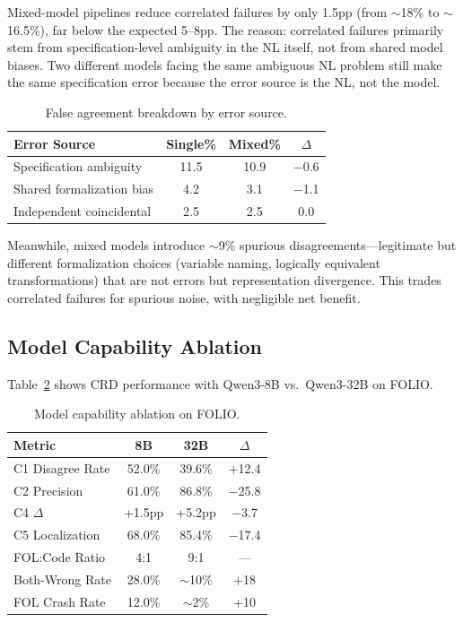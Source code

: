 \documentclass[11pt,a4paper]{article}
\newcommand{\pp}{\text{pp}}
\begin{document}
Mixed-model pipelines reduce correlated failures by only 1.5pp (from $\sim$18\% to $\sim$16.5\%), far below the expected 5--8pp. The reason: correlated failures primarily stem from specification-level ambiguity in the NL itself, not from shared model biases. Two different models facing the same ambiguous NL problem still make the same specification error because the error source is the NL, not the model.

\begin{table}[t]
\centering
\small
\caption{False agreement breakdown by error source.}
\label{tab:false_agree}
\begin{tabular}{lccc}
\toprule
\textbf{Error Source} & \textbf{Single\%} & \textbf{Mixed\%} & $\Delta$ \\
\midrule
Specification ambiguity & 11.5 & 10.9 & $-$0.6 \\
Shared formalization bias & 4.2 & 3.1 & $-$1.1 \\
Independent coincidental & 2.5 & 2.5 & 0.0 \\
\bottomrule
\end{tabular}
\end{table}

Meanwhile, mixed models introduce $\sim$9\% spurious disagreements---legitimate but different formalization choices (variable naming, logically equivalent transformations) that are not errors but representation divergence. This trades correlated failures for spurious noise, with negligible net benefit.

\subsection{Model Capability Ablation}
\label{sec:capability}

Table~\ref{tab:model_cap} shows CRD performance with Qwen3-8B vs.\ Qwen3-32B on FOLIO.

\begin{table}[t]
\centering
\small
\caption{Model capability ablation on FOLIO.}
\label{tab:model_cap}
\begin{tabular}{lccc}
\toprule
\textbf{Metric} & \textbf{8B} & \textbf{32B} & $\Delta$ \\
\midrule
C1 Disagree Rate & 52.0\% & 39.6\% & +12.4 \\
C2 Precision & 61.0\% & 86.8\% & $-$25.8 \\
C4 $\Delta$ & +1.5$\pp$ & +5.2$\pp$ & $-$3.7 \\
C5 Localization & 68.0\% & 85.4\% & $-$17.4 \\
FOL:Code Ratio & 4:1 & 9:1 & --- \\
Both-Wrong Rate & 28.0\% & $\sim$10\% & +18 \\
FOL Crash Rate & 12.0\% & $\sim$2\% & +10 \\
\bottomrule
\end{tabular}
\end{table}
\end{document}
